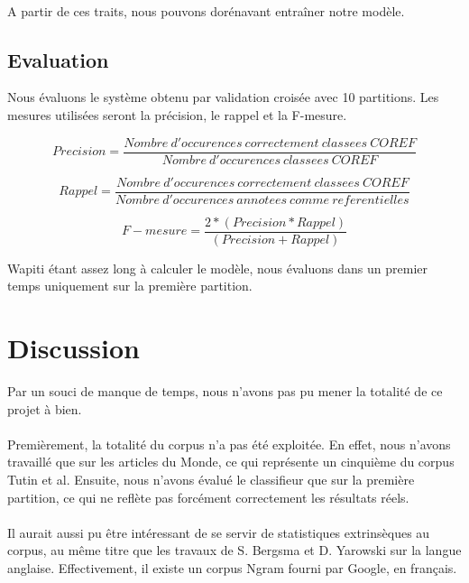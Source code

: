 \documentclass[a4paper,12pt]{article}
\begin{document}
\paragraph{}
A partir de ces traits, nous pouvons dorénavant entraîner notre modèle.

\subsection{Evaluation}

Nous évaluons le système obtenu par validation croisée avec 10 partitions. Les mesures utilisées seront la précision, le rappel et la F-mesure.

\[ Precision = \frac{Nombre\ d'occurences\ correctement\ classees\ COREF}{Nombre\ d'occurences\ classees\ COREF} \]

\[ Rappel = \frac{Nombre\ d'occurences\ correctement\ classees\ COREF}{Nombre\ d'occurences\ annotees\ comme\ referentielles} \]

\[ F-mesure = \frac{2 * (Precision * Rappel)}{(Precision + Rappel)} \]

Wapiti étant assez long à calculer le modèle, nous évaluons dans un premier temps uniquement sur la première partition.


\section{Discussion}

Par un souci de manque de temps, nous n'avons pas pu mener la totalité de ce projet à bien.

\paragraph{}
Premièrement, la totalité du corpus n'a pas été exploitée. En effet, nous n'avons travaillé que sur les articles du Monde, ce qui représente un cinquième du corpus Tutin et al. Ensuite, nous n'avons évalué le classifieur que sur la première partition, ce qui ne reflète pas forcément correctement les résultats réels.

\paragraph{}
Il aurait aussi pu être intéressant de se servir de statistiques extrinsèques au corpus, au même titre que les travaux de S. Bergsma et D. Yarowski sur la langue anglaise. Effectivement, il existe un corpus Ngram fourni par Google, en français.
\end{document}
